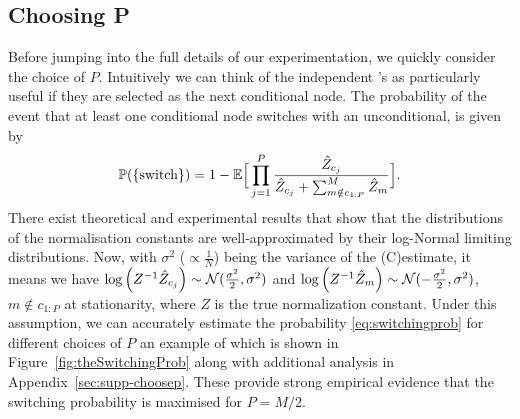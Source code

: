 

\subsection{Choosing P}
\label{sec:choosingP}
Before jumping into the full details of our experimentation, we quickly consider the choice of $P$. Intuitively we can think of the independent \smc's as particularly useful if they are selected as the next conditional node. The probability of the event %
that at least one conditional node switches with an unconditional, is given by
\begin{align}
\label{eq:switchingprob}
\mathbb{P}(\{\text{switch}\}) 
= 1 - \mathbb{E}\Big[\prod_{j=1}^P \frac{\hat Z_{c_j}}{\hat Z_{c_j} +\sum_{m \notin c_{1:P}}^M \hat Z_{m}}\Big].
\end{align}
There exist theoretical and experimental results \citep{pitt2012some,berard2014lognormal,doucet2015efficient} that show that the distributions of the normalisation constants are well-approximated by their log-Normal limiting distributions. Now, with $\sigma^2$ ($\propto \frac{1}{N}$) being the variance of the (C)\smc estimate, it means we have $\log \left(Z^{-1} \hat Z_{c_j} \right) \sim \mathcal{N}(\frac{\sigma^2}{2},\sigma^2)$ and $\log \left(Z^{-1} \hat Z_{m} \right) \sim \mathcal{N}(-\frac{\sigma^2}{2},\sigma^2)$, $m\notin c_{1:P}$ at stationarity, where $Z$ is the true normalization constant. Under this assumption, we can accurately estimate the probability \eqref{eq:switchingprob} for different choices of $P$ an example of which is shown in Figure~\ref{fig:theSwitchingProb} along with additional analysis in Appendix~\ref{sec:supp-choosep}. These provide strong empirical evidence that the switching probability is maximised for $P=M/2$.

